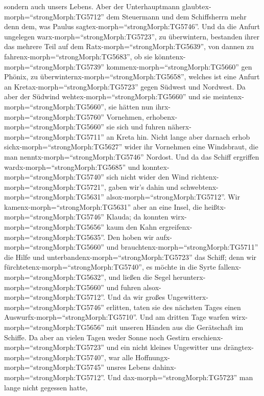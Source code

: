 sondern auch unsers Lebens.  Aber der Unterhauptmann
glaubtex-morph=``strongMorph:TG5712'' dem Steuermann und dem
Schiffsherrn mehr denn dem, was Paulus
sagtex-morph=``strongMorph:TG5746''.  Und da die Anfurt
ungelegen warx-morph=``strongMorph:TG5723'', zu überwintern, bestanden
ihrer das mehrere Teil auf dem Ratx-morph=``strongMorph:TG5639'', von
dannen zu fahrenx-morph=``strongMorph:TG5683'', ob sie
könntenx-morph=``strongMorph:TG5739''
kommenx-morph=``strongMorph:TG5660'' gen Phönix, zu
überwinternx-morph=``strongMorph:TG5658'', welches ist eine Anfurt an
Kretax-morph=``strongMorph:TG5723'' gegen Südwest und Nordwest.
 Da aber der Südwind wehtex-morph=``strongMorph:TG5660''
und sie meintenx-morph=``strongMorph:TG5660'', sie hätten nun
ihrx-morph=``strongMorph:TG5760'' Vornehmen,
erhobenx-morph=``strongMorph:TG5660'' sie sich und fuhren
näherx-morph=``strongMorph:TG5711'' an Kreta hin.  Nicht
lange aber darnach erhob sichx-morph=``strongMorph:TG5627'' wider ihr
Vornehmen eine Windsbraut, die man nenntx-morph=``strongMorph:TG5746''
Nordost.  Und da das Schiff ergriffen
wardx-morph=``strongMorph:TG5685'' und
konntex-morph=``strongMorph:TG5740'' sich nicht wider den Wind
richtenx-morph=``strongMorph:TG5721'', gaben wir's dahin und
schwebtenx-morph=``strongMorph:TG5631''
alsox-morph=``strongMorph:TG5712''.  Wir
kamenx-morph=``strongMorph:TG5631'' aber an eine Insel, die
heißtx-morph=``strongMorph:TG5746'' Klauda; da konnten
wirx-morph=``strongMorph:TG5656'' kaum den Kahn
ergreifenx-morph=``strongMorph:TG5635''.  Den hoben wir
aufx-morph=``strongMorph:TG5660'' und
brauchtenx-morph=``strongMorph:TG5711'' die Hilfe und
unterbandenx-morph=``strongMorph:TG5723'' das Schiff; denn wir
fürchtetenx-morph=``strongMorph:TG5740'', es möchte in die Syrte
fallenx-morph=``strongMorph:TG5632'', und ließen die Segel
herunterx-morph=``strongMorph:TG5660'' und fuhren
alsox-morph=``strongMorph:TG5712''.  Und da wir großes
Ungewitterx-morph=``strongMorph:TG5746'' erlitten, taten sie des
nächsten Tages einen Auswurfx-morph=``strongMorph:TG5710''.
 Und am dritten Tage warfen
wirx-morph=``strongMorph:TG5656'' mit unseren Händen aus die Gerätschaft
im Schiffe.  Da aber an vielen Tagen weder Sonne noch
Gestirn erschienx-morph=``strongMorph:TG5723'' und ein nicht kleines
Ungewitter uns drängtex-morph=``strongMorph:TG5740'', war alle
Hoffnungx-morph=``strongMorph:TG5745'' unsres Lebens
dahinx-morph=``strongMorph:TG5712''.  Und
dax-morph=``strongMorph:TG5723'' man lange nicht gegessen hatte,
